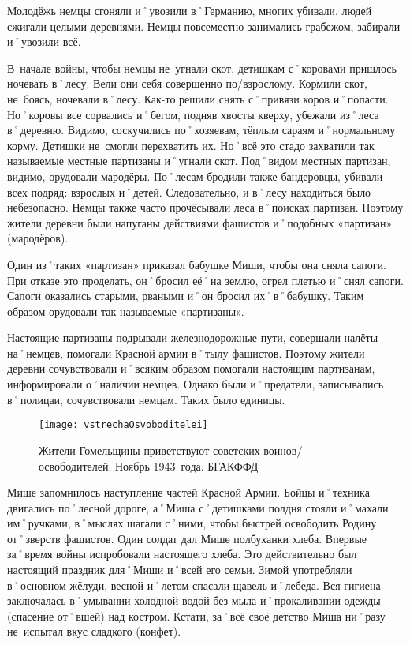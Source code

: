 Молодёжь немцы сгоняли и˚увозили в˚Германию, многих убивали, людей сжигали целыми деревнями. Немцы повсеместно занимались грабежом, забирали и˚увозили всё.

В~начале войны, чтобы немцы не~угнали скот, детишкам с˚коровами пришлось ночевать в˚лесу. Вели они себя совершенно по\=/взрослому. Кормили скот, не~боясь, ночевали в˚лесу. Как-то решили снять с˚привязи коров и˚попасти. Но˚коровы все сорвались и˚бегом, подняв хвосты кверху, убежали из˚леса в˚деревню. Видимо, соскучились по˚хозяевам, тёплым сараям и˚нормальному корму. Детишки не~смогли перехватить их. Но˚всё это стадо захватили так называемые местные партизаны и˚угнали скот. Под˚видом местных партизан, видимо, орудовали мародёры. По˚лесам бродили также бандеровцы, убивали всех подряд: взрослых и˚детей. Следовательно, и в˚лесу находиться было небезопасно. Немцы также часто прочёсывали леса в˚поисках партизан. Поэтому жители деревни были напуганы действиями фашистов и˚подобных «партизан» (мародёров). 

Один из˚таких «партизан» приказал бабушке Миши, чтобы она сняла сапоги. При отказе это проделать, он˚бросил её˚на землю, огрел плетью и˚снял сапоги. Сапоги оказались старыми, рваными и˚он бросил их˚в˚бабушку. Таким образом орудовали так называемые «партизаны».

Настоящие партизаны подрывали железнодорожные пути, совершали налёты на˚немцев, помогали Красной армии в˚тылу фашистов. Поэтому жители деревни сочувствовали и˚всяким образом помогали настоящим партизанам, информировали о˚наличии немцев. Однако были и˚предатели, записывались в˚полицаи, сочувствовали немцам. Таких было единицы. 

\begin{wrapfigure}{O}{.4\textwidth}
\centering
\texttt{[image: vstrechaOsvoboditelei]}
\caption{Жители Гомельщины приветствуют советских воинов\-/освободителей. Ноябрь 1943~года. БГАКФФД}
\label{fig:vstrechaOsvoboditelei}
\end{wrapfigure}

Мише запомнилось наступление частей Красной Армии. Бойцы и˚техника двигались по˚лесной дороге, а˚Миша с˚детишками полдня стояли и˚махали им˚ручками, в˚мыслях шагали с˚ними, чтобы быстрей освободить Родину от˚зверств фашистов. Один солдат дал Мише полбуханки хлеба. Впервые за˚время войны испробовали настоящего хлеба. Это действительно был настоящий праздник для˚Миши и˚всей его семьи. Зимой употребляли в˚основном жёлуди, весной и˚летом спасали щавель и˚лебеда. Вся гигиена заключалась в˚умывании холодной водой без мыла и˚прокаливании одежды (спасение от˚вшей) над костром. Кстати, за˚всё своё детство Миша ни˚разу не~испытал вкус сладкого (конфет).

